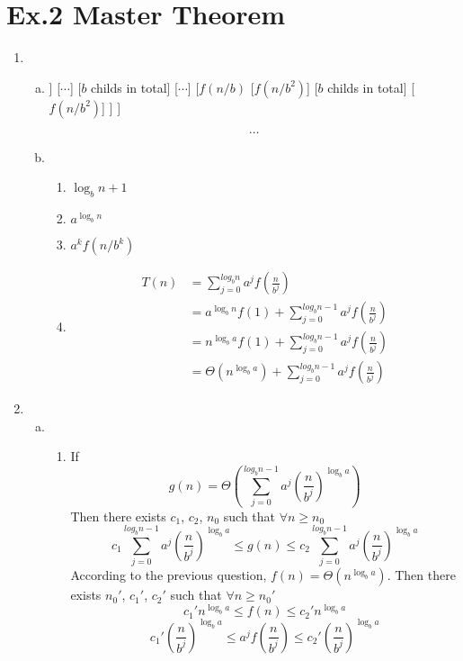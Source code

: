 \documentclass[a4paper]{article}
\begin{document}
\section*{Ex.2 Master Theorem}
	\begin{enumerate}[1.]
		\item
		\begin{enumerate}[a)]
			\item
			\begin{forest}
				[$f(n)$
					[$f(n/b)$
						[$f(n/b^2)$]
						[$b$ childs in total]
						[$f(n/b^2)$]
					]
					[$\cdots$]
					[$b$ childs in total]
					[$\cdots$]
					[$f(n/b)$
						[$f(n/b^2)$]
						[$b$ childs in total]
						[$f(n/b^2)$]
					]
				]
			\end{forest}
			$$\cdots$$
			\item
			\begin{enumerate}[i - ]
				\item $\log_bn+1$
				\item $a^{\log_b n}$
				\item $a^kf(n/b^k)$
				\item
				\begin{align*}
					T(n)&=\sum_{j=0}^{log_bn}a^jf(\frac{n}{b^j})\\
					&=a^{\log_bn}f(1) + \sum_{j=0}^{log_bn-1}a^jf(\frac{n}{b^j})\\
					&=n^{\log_ba}f(1) + \sum_{j=0}^{log_bn-1}a^jf(\frac{n}{b^j})\\
					&=\Theta(n^{\log_ba}) + \sum_{j=0}^{log_bn-1}a^jf(\frac{n}{b^j})
				\end{align*}
			\end{enumerate}
		\end{enumerate}
		\item
		\begin{enumerate}[a)]
			\item
			\begin{enumerate}[i - ]
				\item If $$g(n) = \Theta\left(\sum_{j=0}^{log_bn-1}a^j(\frac{n}{b^j})^{\log_ba}\right)$$
				Then there exists $c_1$, $c_2$, $n_0$ such that $\forall n\geq n_0$
				$$c_1\sum_{j=0}^{log_bn-1}a^j(\frac{n}{b^j})^{\log_ba}\leq g(n) \leq c_2\sum_{j=0}^{log_bn-1}a^j(\frac{n}{b^j})^{\log_ba}$$
				According to the previous question, $f(n)=\Theta(n^{\log_ba})$. Then there exists $n_0'$, $c_1'$, $c_2'$ such that $\forall n\geq n_0'$
				$$c_1'n^{\log_ba} \leq f(n) \leq c_2'n^{\log_ba}$$
				$$c_1'\left(\frac{n}{b^j}\right)^{\log_ba} \leq a^jf\left(\frac{n}{b^j}\right) \leq c_2'\left(\frac{n}{b^j}\right)^{\log_ba}$$

\end{enumerate}
\end{enumerate}
\end{enumerate}
\end{document}

